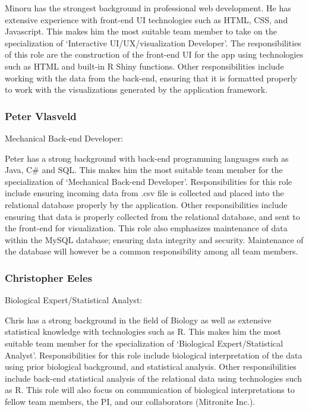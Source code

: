 \documentclass[10pt,twocolumn,letterpaper]{article}
\begin{document}
		Minoru has the strongest background in professional web development.
		He has extensive experience with front-end UI technologies such as HTML, CSS, and Javascript.
		This makes him the most suitable team member to take on the specialization of `Interactive UI/UX/visualization Developer'.
		The responsibilities of this role are the construction of the front-end UI for the app using technologies such as HTML and built-in R Shiny functions.
		Other responsibilities include working with the data from the back-end, ensuring that it is formatted properly to work with the visualizations generated 
		by the application framework.

                \subsubsection*{Peter Vlasveld}

                Mechanical Back-end Developer:

		Peter has a strong background with back-end programming languages such as Java, C# and SQL.
		This makes him the most suitable team member for the specialization of `Mechanical Back-end Developer'.
		Responsibilities for this role include ensuring incoming data from .csv file is collected and placed into 
		the relational database properly by the application.
		Other responsibilities include ensuring that data is properly collected from the relational database, and sent to the front-end for visualization.
		This role also emphasizes maintenance of data within the MySQL database; ensuring data integrity and security.
		Maintenance of the database will however be a common responsibility among all team members.

                \subsubsection*{Christopher Eeles}

                Biological Expert/Statistical Analyst:
		
		Chris has a strong background in the field of Biology as well as extensive statistical knowledge with technologies such as R.
		This makes him the most suitable team member for the specialization of `Biological Expert/Statistical Analyst'.
		Responsibilities for this role include biological interpretation of the data using prior biological background, and statistical analysis.
		Other responsibilities include back-end statistical analysis of the relational data using technologies such as R.
		This role will also focus on communication of biological interpretations to fellow team members, the PI, and our collaborators (Mitronite Inc.).	
		
\end{document}
